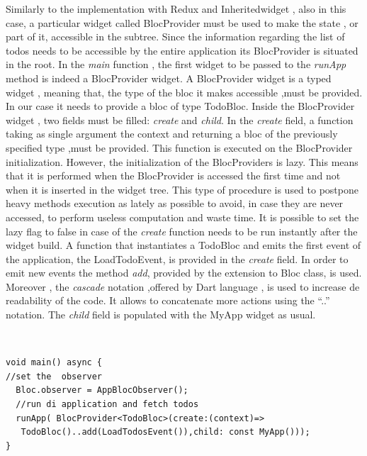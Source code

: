 Similarly to the implementation with Redux and Inheritedwidget , also in this case, a particular widget called BlocProvider must be used to make the state , or part of it, accessible in the subtree. Since the information regarding the list of todos needs to be accessible by the entire application its BlocProvider is situated in the root. In the \textit{main} function , the first widget to be passed to the \textit{runApp} method is indeed a BlocProvider widget. A BlocProvider widget is a typed widget , meaning that, the type of the bloc it makes accessible ,must be provided. In our case it needs to provide a bloc of type TodoBloc. Inside the BlocProvider widget , two fields must  be filled: \textit{create} and \textit{child}. In the \textit{create} field, a function taking as single argument the context and returning a bloc of the previously specified type ,must be provided. This function is executed on the BlocProvider initialization. However, the initialization of the BlocProviders is lazy. This means that it is performed when the BlocProvider is accessed the first time and not when it is inserted in the widget tree. This type of procedure is used to postpone heavy methods execution as lately as possible to avoid, in case they are never accessed, to perform useless computation and waste time. It is possible to set the lazy flag to false in case of the \textit{create} function needs to be run instantly after the widget build. A function that instantiates a TodoBloc and emits the first event of the application, the LoadTodoEvent, is provided in the \textit{create} field. In order to emit new events the method \textit{add}, provided by the extension to Bloc class, is used. Moreover , the \textit{cascade} notation ,offered by Dart language , is used to increase de readability of the code. It allows to concatenate more actions using the  “..” notation.
The \textit{child} field is populated with the MyApp widget as usual.
\begin{code}
\mbox{}\\
 \mbox{}
\label{code:2.14}
\begin{verbatim}
void main() async {
//set the  observer
  Bloc.observer = AppBlocObserver();
  //run di application and fetch todos
  runApp( BlocProvider<TodoBloc>(create:(context)=>
   TodoBloc()..add(LoadTodosEvent()),child: const MyApp()));
}
\end{verbatim}
\mbox{}
\end{code}

